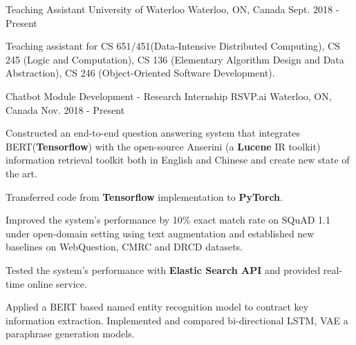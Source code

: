 

\begin{cventries}


  \cventry
    {Teaching Assistant} %
    {University of Waterloo} %
    {Waterloo, ON, Canada} %
    {Sept. 2018 - Present} %
    {
      \begin{cvitems} %
        \item {Teaching assistant for CS 651/451(Data-Intensive Distributed Computing), CS 245 (Logic and Computation), CS 136 (Elementary Algorithm Design and Data Abstraction), CS 246 (Object-Oriented Software Development).}
      \end{cvitems}
    }
    
  \cventry
    {Chatbot Module Development - Research Internship} %
    {RSVP.ai} %
    {Waterloo, ON, Canada} %
    {Nov. 2018 - Present} %
    {
      \begin{cvitems} %
        \item {Constructed an end-to-end question answering system that integrates BERT(\textbf{Tensorflow}) with the open-source Anserini (a \textbf{Lucene} IR toolkit) information retrieval toolkit both in English and Chinese and create new state of the art.}
        \item {Transferred code from \textbf{Tensorflow} implementation to \textbf{PyTorch}.}
        \item {Improved the system's performance by 10\% exact match rate on SQuAD 1.1 under open-domain setting using text augmentation and established new baselines on WebQuestion, CMRC and DRCD datasets.}
	\item {Tested the system's performance with \textbf{Elastic Search API} and provided real-time online service.}
        \item {Applied a BERT based named entity recognition model to contract key information extraction. Implemented and compared bi-directional LSTM, VAE a  paraphrase generation models.}
      \end{cvitems}
    }
    

\end{cventries}
